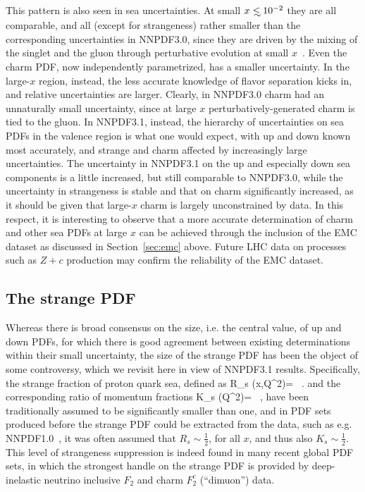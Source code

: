 This  pattern is also seen in  sea uncertainties. At small
$x\lsim 10^{-2}$ they are all comparable, and all (except for strangeness) 
rather smaller than
the corresponding uncertainties in NNPDF3.0, since they are driven by
the mixing of the singlet and the gluon through perturbative
evolution at small $x$~\cite{das}. Even the charm PDF, now
independently parametrized, has
a smaller uncertainty. In the large-$x$ region, instead, the less
accurate knowledge of flavor separation kicks in, and  relative uncertainties 
are larger.
Clearly, in NNPDF3.0
charm had an unnaturally small uncertainty, since at large $x$ 
perturbatively-generated charm is tied to the gluon. In NNPDF3.1, instead, the
hierarchy of uncertainties on sea PDFs in the valence region is what
one would expect, with up and down known most accurately, and strange
and charm affected by increasingly large uncertainties. The
uncertainty in NNPDF3.1 on the up and especially down sea components is a little 
increased, but 
still comparable to NNPDF3.0, while the uncertainty in strangeness is
stable and that on 
charm significantly increased, as it should be given that large-$x$
charm is largely unconstrained by data. In this respect, it is
interesting to observe that a more accurate determination of charm
and other sea PDFs at large $x$ can be achieved through the inclusion
of the EMC dataset as discussed in Section~\ref{sec:emc} above. Future LHC
data on processes such as $Z+c$ production may confirm the reliability
of the EMC dataset.

\subsection{The strange PDF}
\label{sec:strangeness}

Whereas there is broad consensus on the size, i.e. the central value,
of up and down PDFs, for which there is good agreement between existing
determinations within their small uncertainty, the size of the strange
PDF has been the object of some controversy, which we revisit here in
view of NNPDF3.1 results.
Specifically, the strange fraction of proton quark sea, defined as
\be
\label{eq:rs}
R_s (x,Q^2)= \, .
\ee
and the corresponding ratio of momentum fractions
\be
\label{eq:rsint}
K_s (Q^2)=  \, ,
\ee
have been traditionally assumed to be significantly smaller than one,
and in PDF sets produced before the strange PDF could be extracted
from the data, such as e.g. NNPDF1.0~\cite{Ball:2008by}, it was often
assumed that $R_s\sim\frac{1}{2}$, for all $x$, and thus also 
$K_s\sim\frac{1}{2}$. This level of strangeness suppression is indeed found in
many recent global PDF sets, in which the strongest handle on the strange
PDF is provided by deep-inelastic neutrino inclusive $F_2$ and  charm
$F_2^c$ (``dimuon'') data. 


